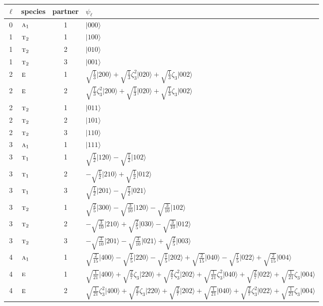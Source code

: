 \documentclass[11pt]{article}
\newcommand{\irr}[1]{\text{\normalfont\scshape #1}}
\newcommand{\rootunity}[1]{\zeta_{#1}}
\newcommand{\occ}[1]{\lvert #1\rangle}
\begin{document}
\begin{longtable}{c l c p{}}\hline $\ell$ & species & partner & $\psi_\ell$\\ \hline\endhead
0 & $\irr{a}_{1}$ & 1 & $\occ{000}$\\
\hline
1 & $\irr{t}_{2}$ & 1 & $\occ{100}$\\
1 & $\irr{t}_{2}$ & 2 & $\occ{010}$\\
1 & $\irr{t}_{2}$ & 3 & $\occ{001}$\\
\hline
2 & $\irr{e}$ & 1 & $\sqrt{\tfrac{1}{3}}\occ{200}+\sqrt{\tfrac{1}{3}}\rootunity{3}^{2}\occ{020}+\sqrt{\tfrac{1}{3}}\rootunity{3}\occ{002}$\\
2 & $\irr{e}$ & 2 & $\sqrt{\tfrac{1}{3}}\rootunity{3}^{2}\occ{200}+\sqrt{\tfrac{1}{3}}\occ{020}+\sqrt{\tfrac{1}{3}}\rootunity{3}\occ{002}$\\
2 & $\irr{t}_{2}$ & 1 & $\occ{011}$\\
2 & $\irr{t}_{2}$ & 2 & $\occ{101}$\\
2 & $\irr{t}_{2}$ & 3 & $\occ{110}$\\
\hline
3 & $\irr{a}_{1}$ & 1 & $\occ{111}$\\
3 & $\irr{t}_{1}$ & 1 & $\sqrt{\tfrac{1}{2}}\occ{120}-\sqrt{\tfrac{1}{2}}\occ{102}$\\
3 & $\irr{t}_{1}$ & 2 & $-\sqrt{\tfrac{1}{2}}\occ{210}+\sqrt{\tfrac{1}{2}}\occ{012}$\\
3 & $\irr{t}_{1}$ & 3 & $\sqrt{\tfrac{1}{2}}\occ{201}-\sqrt{\tfrac{1}{2}}\occ{021}$\\
3 & $\irr{t}_{2}$ & 1 & $\sqrt{\tfrac{2}{5}}\occ{300}-\sqrt{\tfrac{3}{10}}\occ{120}-\sqrt{\tfrac{3}{10}}\occ{102}$\\
3 & $\irr{t}_{2}$ & 2 & $-\sqrt{\tfrac{3}{10}}\occ{210}+\sqrt{\tfrac{2}{5}}\occ{030}-\sqrt{\tfrac{3}{10}}\occ{012}$\\
3 & $\irr{t}_{2}$ & 3 & $-\sqrt{\tfrac{3}{10}}\occ{201}-\sqrt{\tfrac{3}{10}}\occ{021}+\sqrt{\tfrac{2}{5}}\occ{003}$\\
\hline
4 & $\irr{a}_{1}$ & 1 & $\sqrt{\tfrac{2}{15}}\occ{400}-\sqrt{\tfrac{1}{5}}\occ{220}-\sqrt{\tfrac{1}{5}}\occ{202}+\sqrt{\tfrac{2}{15}}\occ{040}-\sqrt{\tfrac{1}{5}}\occ{022}+\sqrt{\tfrac{2}{15}}\occ{004}$\\
4 & $\irr{e}$ & 1 & $\sqrt{\tfrac{1}{21}}\occ{400}+\sqrt{\tfrac{2}{7}}\rootunity{3}\occ{220}+\sqrt{\tfrac{2}{7}}\rootunity{3}^{2}\occ{202}+\sqrt{\tfrac{1}{21}}\rootunity{3}^{2}\occ{040}+\sqrt{\tfrac{2}{7}}\occ{022}+\sqrt{\tfrac{1}{21}}\rootunity{3}\occ{004}$\\
4 & $\irr{e}$ & 2 & $\sqrt{\tfrac{1}{21}}\rootunity{3}^{2}\occ{400}+\sqrt{\tfrac{2}{7}}\rootunity{3}\occ{220}+\sqrt{\tfrac{2}{7}}\occ{202}+\sqrt{\tfrac{1}{21}}\occ{040}+\sqrt{\tfrac{2}{7}}\rootunity{3}^{2}\occ{022}+\sqrt{\tfrac{1}{21}}\rootunity{3}\occ{004}$\\

\end{longtable}
\end{document}
